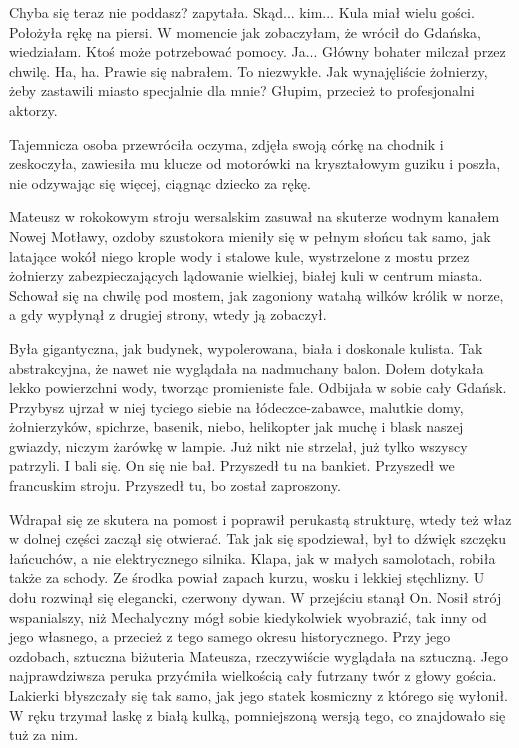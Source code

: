 \begin{dialogue}
\ds{} Chyba się teraz nie poddasz? \dm{} zapytała.
\ds{} Skąd... kim...
\ds{} Kula miał wielu gości. \dm{} Położyła rękę na piersi. \dm{} W momencie jak zobaczyłam, że wrócił do Gdańska, wiedziałam. Ktoś może potrzebować pomocy.
\ds{} Ja... \dm{} Główny bohater milczał przez chwilę. \dm{} Ha, ha. Prawie się nabrałem.
To niezwykłe. Jak wynajęliście żołnierzy, żeby zastawili miasto specjalnie dla mnie? Głupim, przecież to profesjonalni aktorzy.
\end{dialogue}

Tajemnicza osoba przewróciła oczyma, zdjęła swoją córkę na chodnik i zeskoczyła, zawiesiła mu klucze od motorówki na kryształowym guziku i poszła, nie odzywając się więcej, ciągnąc dziecko za rękę.

Mateusz w rokokowym stroju wersalskim zasuwał na skuterze wodnym kanałem Nowej Motławy, ozdoby szustokora mieniły się w pełnym słońcu tak samo, jak latające wokół niego
krople wody i stalowe kule, wystrzelone z mostu przez żołnierzy zabezpieczających lądowanie wielkiej, białej kuli w centrum miasta.
Schował się na chwilę pod mostem, jak zagoniony watahą wilków królik w norze, a gdy wypłynął z drugiej strony, wtedy ją zobaczył.

Była gigantyczna, jak budynek, wypolerowana, biała i doskonale kulista. Tak abstrakcyjna, że nawet nie wyglądała na nadmuchany balon.
Dołem dotykała lekko powierzchni wody, tworząc promieniste fale.
Odbijała w sobie cały Gdańsk.
Przybysz ujrzał w niej tyciego siebie na łódeczce-zabawce, malutkie domy, żołnierzyków, spichrze, basenik, niebo, helikopter jak muchę i blask naszej gwiazdy, niczym żarówkę w lampie.
Już nikt nie strzelał, już tylko wszyscy patrzyli. I bali się.
On się nie bał. 
Przyszedł tu na bankiet.
Przyszedł we francuskim stroju.
Przyszedł tu, bo został zaproszony.

Wdrapał się ze skutera na pomost i poprawił perukastą strukturę, wtedy też właz w dolnej części zaczął się otwierać.
Tak jak się spodziewał, był to dźwięk szczęku łańcuchów, a nie elektrycznego silnika. Klapa, jak w małych samolotach, robiła także za schody.
Ze środka powiał zapach kurzu, wosku i lekkiej stęchlizny.
U dołu rozwinął się elegancki, czerwony dywan.
W przejściu stanął On.
Nosił strój wspanialszy, niż Mechalyczny mógł sobie kiedykolwiek wyobrazić, tak inny od jego własnego, a przecież z tego samego okresu historycznego.
Przy jego ozdobach, sztuczna biżuteria Mateusza, rzeczywiście wyglądała na sztuczną.
Jego najprawdziwsza peruka przyćmiła wielkością cały futrzany twór z głowy gościa.
Lakierki błyszczały się tak samo, jak jego statek kosmiczny z którego się wyłonił.
W ręku trzymał laskę z białą kulką, pomniejszoną wersją tego, co znajdowało się tuż za nim.

